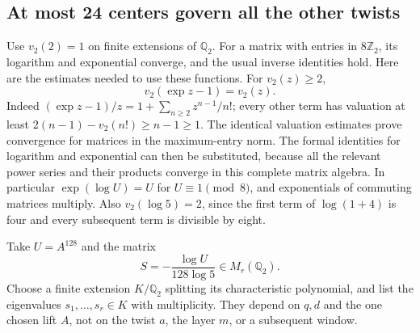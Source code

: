 \subsection{At most 24 centers govern all the other twists}
Use \(v_2(2)=1\) on finite extensions of \(\mathbb Q_2\).
For a matrix with entries in \(8\mathbb Z_2\), its logarithm and
exponential converge, and the usual inverse identities hold.
Here are the estimates needed to use these functions.
For \(v_2(z)\geq2\),
\[
 v_2(\exp z-1)=v_2(z).
\]
Indeed \((\exp z-1)/z=1+\sum_{n\geq2}z^{n-1}/n!\);
every other term has valuation at least
\(2(n-1)-v_2(n!)\geq n-1\geq1\).
The identical valuation estimates prove convergence for matrices
in the maximum-entry norm.
The formal identities for logarithm and exponential can then be
substituted, because all the relevant power series and their
products converge in this complete matrix algebra.
In particular \(\exp(\log U)=U\) for \(U\equiv1\pmod8\),
and exponentials of commuting matrices multiply.
Also \(v_2(\log5)=2\), since the first term of
\(\log(1+4)\) is four and every subsequent term is divisible by eight.

Take \(U=A^{128}\) and the matrix
\[
              S=-\frac{\log U}{128\log5}\in M_r(\mathbb Q_2).
\]
Choose a finite extension \(K/\mathbb Q_2\) splitting its
characteristic polynomial, and list the eigenvalues
\(s_1,\ldots,s_r\in K\) with multiplicity.
They depend on \(q,d\) and the one chosen lift \(A\), not on the
twist \(a\), the layer \(m\), or a subsequent window.

